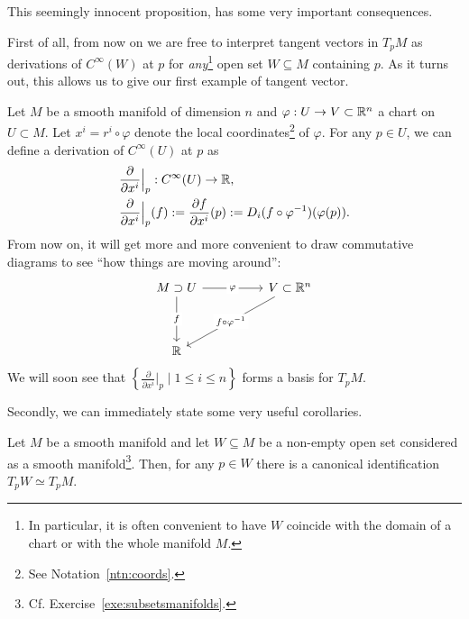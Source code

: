 This seemingly innocent proposition, has some very important consequences.

First of all, from now on we are free to interpret tangent vectors in $T_p M$ as derivations of $C^\infty(W)$ at $p$ for \emph{any}\footnote{In particular, it is often convenient to have $W$ coincide with the domain of a chart or with the whole manifold $M$.} open set $W\subseteq M$ containing $p$.
As it turns out, this allows us to give our first example of tangent vector.

\begin{example}\label{ex:partialderivative}
  Let $M$ be a smooth manifold of dimension $n$ and $\varphi: U \to V\subset\mathbb{R}^n$ a chart on $U\subset M$.
  Let $x^i = r^i \circ \varphi$ denote the local coordinates\footnote{See Notation~\ref{ntn:coords}.} of $\varphi$.
  For any $p\in U$, we can define a derivation of $C^\infty(U)$ at $p$ as
  \begin{align}
     & \frac{\partial}{\partial x^i}\Big|_p : C^\infty(U) \to \mathbb{R},                                                             \\
     & \frac{\partial}{\partial x^i}\Big|_p (f) := \frac{\partial f}{\partial x^i}(p) := D_i(f\circ\varphi^{-1})(\varphi(p)).
  \end{align}
  From now on, it will get more and more convenient to draw commutative diagrams to see ``how things are moving around'':
  \begin{equation}
    \begin{tikzcd}[column sep = huge, row sep = huge]
      M\supset U \arrow[r, "\varphi" description] \arrow[d, "f" description] & V \subset\R^n \arrow [dl, "f\circ\varphi^{-1}" description]\\
      \R &
    \end{tikzcd}
  \end{equation}
  We will soon see that $\left\{\frac{\partial}{\partial x^i}\Big|_p \mid 1\leq i\leq n\right\}$ forms a basis for $T_p M$.
\end{example}

Secondly, we can immediately state some very useful corollaries.

\begin{corollary}\label{cor:tgsubspace}
  Let $M$ be a smooth manifold and let $W\subseteq M$ be a non-empty open set considered as a smooth manifold\footnote{Cf. Exercise~\ref{exe:subsetsmanifolds}.}.
  Then, for any $p\in W$ there is a canonical identification $T_p W \simeq T_p M$.
\end{corollary}


